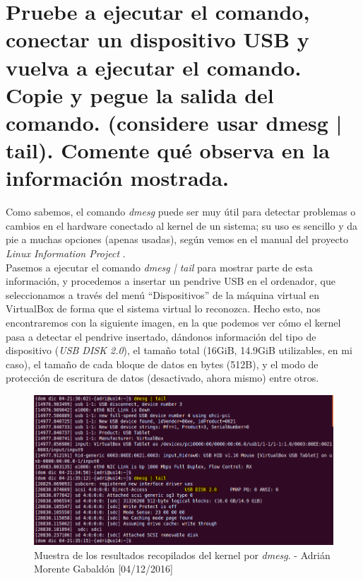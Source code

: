 \section{Pruebe a ejecutar el comando, conectar un dispositivo USB y vuelva a ejecutar el comando. Copie y pegue la salida del comando. (considere usar dmesg | tail). Comente qué observa en la información mostrada.}
Como sabemos, el comando \emph{dmesg} puede ser muy útil para detectar problemas o cambios en el hardware conectado al kernel de un sistema; su uso es sencillo y da pie a muchas opciones (apenas usadas), según vemos en el manual del proyecto \emph{Linux Information Project} \cite{dmesg}. \\
Pasemos a ejecutar el comando \emph{dmesg | tail} para mostrar parte de esta información, y procedemos a insertar un pendrive USB en el ordenador, que seleccionamos a través del menú ``Dispositivos'' de la máquina virtual en VirtualBox de forma que el sistema virtual lo reconozca. Hecho esto, nos encontraremos con la siguiente imagen, en la que podemos ver cómo el kernel pasa a detectar el pendrive insertado, dándonos información del tipo de dispositivo (\emph{USB DISK 2.0}), el tamaño total (16GiB, 14.9GiB utilizables, en mi caso), el tamaño de cada bloque de datos en bytes (512B), y el modo de protección de escritura de datos (desactivado, ahora mismo) entre otros.
\begin{figure}[H]
	\centering
	\includegraphics[scale=0.5]{dmesg}
	\caption{Muestra de los resultados recopilados del kernel por \emph{dmesg}. - Adrián Morente Gabaldón [04/12/2016]}
	\label{figura3}
\end{figure}

